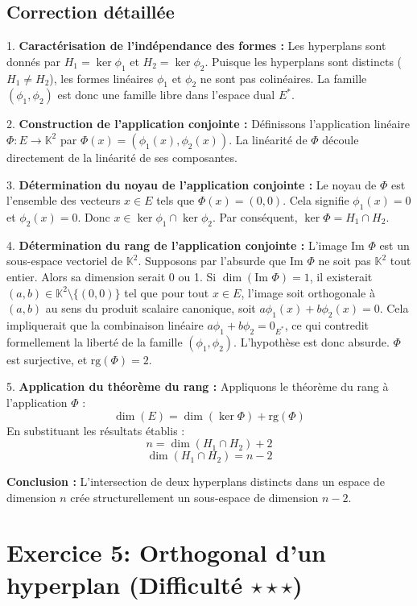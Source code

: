 \documentclass[11pt,a4paper]{report}
\begin{document}
\subsection{Correction détaillée}

1. \textbf{Caractérisation de l'indépendance des formes :}
   Les hyperplans sont donnés par $H_1 = \ker \phi_1$ et $H_2 = \ker \phi_2$.
   Puisque les hyperplans sont distincts ($H_1 \neq H_2$), les formes linéaires $\phi_1$ et $\phi_2$ ne sont pas colinéaires. La famille $(\phi_1, \phi_2)$ est donc une famille libre dans l'espace dual $E^*$.

2. \textbf{Construction de l'application conjointe :}
   Définissons l'application linéaire $\Phi : E \to \mathbb{K}^2$ par $\Phi(x) = (\phi_1(x), \phi_2(x))$.
   La linéarité de $\Phi$ découle directement de la linéarité de ses composantes.

3. \textbf{Détermination du noyau de l'application conjointe :}
   Le noyau de $\Phi$ est l'ensemble des vecteurs $x \in E$ tels que $\Phi(x) = (0, 0)$.
   Cela signifie $\phi_1(x) = 0$ et $\phi_2(x) = 0$.
   Donc $x \in \ker \phi_1 \cap \ker \phi_2$.
   Par conséquent, $\ker \Phi = H_1 \cap H_2$.

4. \textbf{Détermination du rang de l'application conjointe :}
   L'image $\text{Im }\Phi$ est un sous-espace vectoriel de $\mathbb{K}^2$.
   Supposons par l'absurde que $\text{Im }\Phi$ ne soit pas $\mathbb{K}^2$ tout entier. Alors sa dimension serait 0 ou 1.
   Si $\dim(\text{Im }\Phi) = 1$, il existerait $(a, b) \in \mathbb{K}^2 \setminus \{(0,0)\}$ tel que pour tout $x \in E$, l'image soit orthogonale à $(a,b)$ au sens du produit scalaire canonique, soit $a\phi_1(x) + b\phi_2(x) = 0$.
   Cela impliquerait que la combinaison linéaire $a\phi_1 + b\phi_2 = 0_{E^*}$, ce qui contredit formellement la liberté de la famille $(\phi_1, \phi_2)$.
   L'hypothèse est donc absurde. $\Phi$ est surjective, et $\text{rg}(\Phi) = 2$.

5. \textbf{Application du théorème du rang :}
   Appliquons le théorème du rang à l'application $\Phi$ :
   $$\dim(E) = \dim(\ker \Phi) + \text{rg}(\Phi)$$
   En substituant les résultats établis :
   $$n = \dim(H_1 \cap H_2) + 2$$
   $$\dim(H_1 \cap H_2) = n - 2$$

\textbf{Conclusion :}
L'intersection de deux hyperplans distincts dans un espace de dimension $n$ crée structurellement un sous-espace de dimension $n-2$.

\section{Exercice 5: Orthogonal d'un hyperplan (Difficulté $\star \star \star$)}
\end{document}
